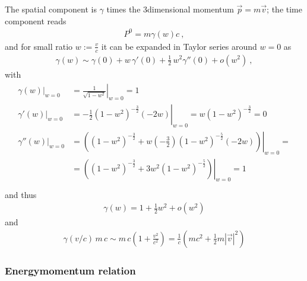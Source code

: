 \documentclass[letterpaper,10pt,english]{jupyterBook}
\begin{document}
\sphinxAtStartPar
The spatial component is \(\gamma\) times the 3\sphinxhyphen{}dimensional momentum \(\vec{p} = m \vec{v}\); the time component reads
\begin{equation*}
\begin{split}P^0 = m \gamma(w) c \ ,\end{split}
\end{equation*}
\sphinxAtStartPar
and for small ratio \(w:= \frac{v}{c}\) it can be expanded in Taylor series around \(w = 0\) as
\begin{equation*}
\begin{split}\gamma(w) \sim \gamma(0) + w \, \gamma'(0) + \frac{1}{2} \, w^2 \gamma''(0) + o(w^2) \ ,\end{split}
\end{equation*}
\sphinxAtStartPar
with
\begin{equation*}
\begin{split}\begin{aligned}
\left.\gamma(w)  \right|_{w=0} & = \left.\frac{1}{\sqrt{1 - w^2}}\right|_{w=0} = 1 \\
\left.\gamma'(w) \right|_{w=0} & = \left.-\frac{1}{2}(1 - w^2)^{-\frac{3}{2}} (- 2 w)\right|_{w=0} = w (1 - w^2)^{-\frac{3}{2}}= 0 \\
\left.\gamma''(w)\right|_{w=0} & = \left. \left( (1-w^2)^{-\frac{3}{2}} + w \left(-\frac{3}{2} \right)(1-w^2)^{-\frac{5}{2}} (- 2 w)  \right)\right|_{w=0} = \\ 
  & = \left. \left( (1-w^2)^{-\frac{3}{2}} + 3 w^2 (1-w^2)^{-\frac{5}{2}} \right)\right|_{w=0} = 1 \\
\end{aligned}\end{split}
\end{equation*}
\sphinxAtStartPar
and thus
\begin{equation*}
\begin{split}\gamma(w) = 1 + \frac{1}{2} w^2 + o(w^2)\end{split}
\end{equation*}
\sphinxAtStartPar
and
\begin{equation*}
\begin{split}\gamma(v/c) \, m \, c \sim m \, c \left( 1 + \frac{v^2}{c^2} \right) = \frac{1}{c} \left( mc^2 + \frac{1}{2} m |\vec{v}|^2 \right) \end{split}
\end{equation*}\subsubsection*{Energy\sphinxhyphen{}momentum relation}
\end{document}

